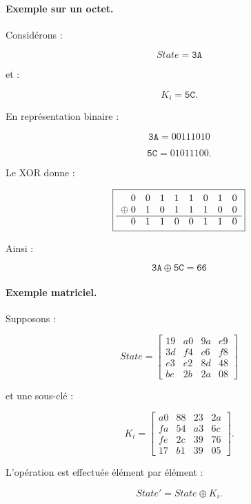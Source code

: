 \documentclass[12pt,a4paper]{article}
\begin{document}
\paragraph{Exemple sur un octet.}

Considérons :

\[
State=\texttt{3A}
\]

et :

\[
K_i=\texttt{5C}.
\]

En représentation binaire :

\[
\texttt{3A}=00111010
\]

\[
\texttt{5C}=01011100.
\]

Le XOR donne :

\[
\boxed{
\begin{array}{c@{\;}cccccccc}
 & 0 & 0 & 1 & 1 & 1 & 0 & 1 & 0 \\
\oplus & 0 & 1 & 0 & 1 & 1 & 1 & 0 & 0 \\
\hline
 & 0 & 1 & 1 & 0 & 0 & 1 & 1 & 0
\end{array}
}
\]

Ainsi :

\[
\boxed{
\texttt{3A} \oplus \texttt{5C} = \texttt{66}
}
\]


\paragraph{Exemple matriciel.}

Supposons :

\[
State=
\begin{bmatrix}
19&a0&9a&e9\\
3d&f4&c6&f8\\
e3&e2&8d&48\\
be&2b&2a&08
\end{bmatrix}
\]

et une sous-clé :

\[
K_i=
\begin{bmatrix}
a0&88&23&2a\\
fa&54&a3&6c\\
fe&2c&39&76\\
17&b1&39&05
\end{bmatrix}.
\]

L'opération est effectuée élément par élément :

\[
State'=State\oplus K_i.
\]
\end{document}
